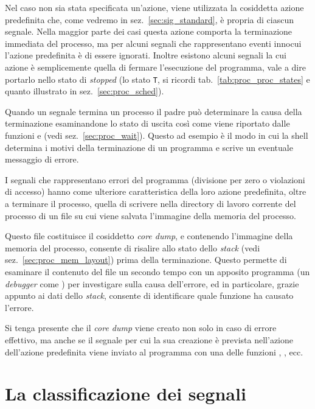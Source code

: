Nel caso non sia stata specificata un'azione, viene utilizzata la cosiddetta
azione predefinita che, come vedremo in sez.~\ref{sec:sig_standard}, è propria
di ciascun segnale. Nella maggior parte dei casi questa azione comporta la
terminazione immediata del processo, ma per alcuni segnali che rappresentano
eventi innocui l'azione predefinita è di essere ignorati. Inoltre esistono
alcuni segnali la cui azione è semplicemente quella di fermare l'esecuzione
del programma, vale a dire portarlo nello stato di \textit{stopped} (lo stato
\texttt{T}, si ricordi tab.~\ref{tab:proc_proc_states} e quanto illustrato in
sez.~\ref{sec:proc_sched}).

Quando un segnale termina un processo il padre può determinare la causa della
terminazione esaminandone lo stato di uscita così come viene riportato dalle
funzioni  e  (vedi sez.~\ref{sec:proc_wait}). Questo
ad esempio è il modo in cui la shell determina i motivi della terminazione di
un programma e scrive un eventuale messaggio di errore.


I segnali che rappresentano errori del programma (divisione per zero o
violazioni di accesso) hanno come ulteriore caratteristica della loro azione
predefinita, oltre a terminare il processo, quella di scrivere nella directory
di lavoro corrente del processo di un file  su cui viene salvata
l'immagine della memoria del processo.

Questo file costituisce il cosiddetto \textit{core dump}, e contenendo
l'immagine della memoria del processo, consente di risalire allo stato dello
\textit{stack} (vedi sez.~\ref{sec:proc_mem_layout}) prima della
terminazione. Questo permette di esaminare il contenuto del file un secondo
tempo con un apposito programma (un \textit{debugger} come ) per
investigare sulla causa dell'errore, ed in particolare, grazie appunto ai dati
dello \textit{stack}, consente di identificare quale funzione ha causato
l'errore.

Si tenga presente che il \textit{core dump} viene creato non solo in caso di
errore effettivo, ma anche se il segnale per cui la sua creazione è prevista
nell'azione dell'azione predefinita viene inviato al programma con una delle
funzioni , , ecc.



\section{La classificazione dei segnali}
\label{sec:sig_classification}

